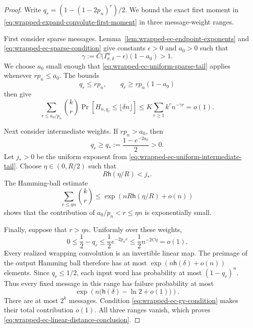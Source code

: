 \begin{proof}
Write $q_r=(1-(1-2p_n)^r)/2$.  We bound the exact first moment in
\eqref{eq:wrapped-expand-convolute-first-moment} in three message-weight
ranges.

First consider sparse messages.  Lemma~\ref{lem:wrapped-ec-endpoint-exponents}
and \eqref{eq:wrapped-ec-sparse-condition} give constants
$\epsilon>0$ and $a_0>0$ such that
\begin{equation}
 \gamma:=
 C\bigl(I^{\mathrm{w}}_{\sigma,\delta}-\epsilon\bigr)(1-a_0)>1.
 \label{eq:wrapped-ec-sparse-margin}
\end{equation}
We choose $a_0$ small enough that
\eqref{eq:wrapped-ec-uniform-sparse-tail} applies whenever $rp_n\leq a_0$.
The bounds
\begin{equation}
 q_r\leq rp_n,
 \qquad
 q_r\geq rp_n(1-a_0)
 \label{eq:wrapped-ec-qr-sparse-bounds}
\end{equation}
then give
\begin{equation}
 \sum_{r\leq a_0/p_n}
 \binom{k}{r}
 \Pr[H_{n,q_r}\leq\lfloor\delta n\rfloor]
 \leq
 K\sum_{r\geq1}k^r n^{-\gamma r}
 =o(1).
 \label{eq:wrapped-ec-sparse-sum}
\end{equation}

Next consider intermediate weights.  If $rp_n>a_0$, then
\begin{equation}
 q_r\geq q_*:=\frac{1-e^{-2a_0}}{2}>0.
 \label{eq:wrapped-ec-intermediate-q}
\end{equation}
Let $j_*>0$ be the uniform exponent from
\eqref{eq:wrapped-ec-uniform-intermediate-tail}.  Choose
$\eta\in(0,R/2)$ such that
\begin{equation}
 R\mathsf{h}(\eta/R)<j_*.
 \label{eq:wrapped-ec-intermediate-eta}
\end{equation}
The Hamming-ball estimate
\begin{equation}
 \sum_{r\leq\eta n}\binom{k}{r}
 \leq\exp\left(nR\mathsf{h}(\eta/R)+o(n)\right)
 \label{eq:wrapped-ec-intermediate-count}
\end{equation}
shows that the contribution of $a_0/p_n<r\leq\eta n$ is exponentially small.

Finally, suppose that $r>\eta n$.  Uniformly over these weights,
\begin{equation}
 0\leq\frac12-q_r
 \leq\frac12e^{-2p_nr}
 \leq\frac12n^{-2C\eta}
 =o(1).
 \label{eq:wrapped-ec-dense-q}
\end{equation}
Every realized wrapping convolution is an invertible linear map.  The
preimage of the output Hamming ball therefore has at most
$\exp(n\mathsf{h}(\delta)+o(n))$ elements.  Since $q_r\leq1/2$, each input word
has probability at most $(1-q_r)^n$.  Thus every fixed message in this range
has failure probability at most
\begin{equation}
 \exp\left(
  n\bigl(\mathsf{h}(\delta)-\ln2+o(1)\bigr)
 \right).
 \label{eq:wrapped-ec-dense-tail}
\end{equation}
There are at most $2^k$ messages.  Condition
\eqref{eq:wrapped-ec-gv-condition} makes their total contribution $o(1)$.
All three ranges vanish, which proves
\eqref{eq:wrapped-ec-linear-distance-conclusion}.
\end{proof}


